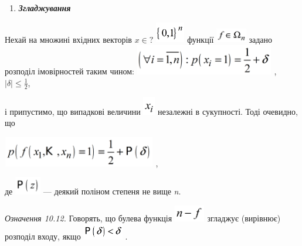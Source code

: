 \liststyleWWviiiNumxxix
\setcounter{saveenum}{\value{enumi}}
\begin{enumerate}
\setcounter{enumi}{\value{saveenum}}
\item {\bfseries\itshape
Згладжування}
\end{enumerate}
Нехай на множині  вхідних векторів  ${x\in ?}$
\includegraphics[width=0.5047in,height=0.3638in]{crypt-img/crypt-img238.png} 
функції 
\includegraphics[width=0.528in,height=0.25in]{crypt-img/crypt-img239.png} 
задано розподіл імовірностей таким чином: 
\includegraphics[width=2.389in,height=0.522in]{crypt-img/crypt-img240.png} , 
${|\delta |\le \frac{1}{2}}$,

і припустимо, що випадкові величини 
\includegraphics[width=0.2083in,height=0.3134in]{crypt-img/crypt-img241.png} 
незалежні в сукупності. Тоді очевидно, що

{\centering
 \includegraphics[width=2.6339in,height=0.5193in]{crypt-img/crypt-img242.png} ,
\par}

де  \includegraphics[width=0.4492in,height=0.311in]{crypt-img/crypt-img243.png} 
--- деякий поліном степеня не вище \textit{n}.

 \textit{Означення 10.12.}\textit{ }Говорять, що булева функція 
\includegraphics[width=0.5319in,height=0.2791in]{crypt-img/crypt-img244.png} 
згладжує (вирівнює) розподіл входу, якщо 
\includegraphics[width=0.6937in,height=0.278in]{crypt-img/crypt-img245.png} .

